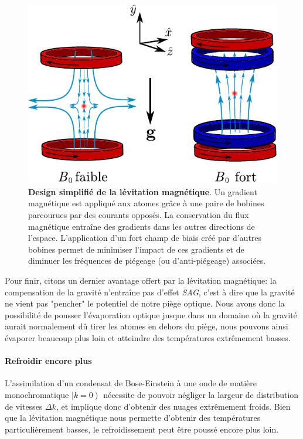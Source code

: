 \begin{figure}
\centering
\includegraphics[scale=1]{Fig/BEC_manip/levitation_simple.pdf}
\caption{\textbf{Design simplifié de la lévitation magnétique}. Un gradient magnétique est appliqué aux atomes grâce à une paire de bobines parcourues par des courants opposés. La conservation du flux magnétique entraîne des gradients dans les autres directions de l'espace. L'application d'un fort champ de biais créé par d'autres bobines permet de minimiser l'impact de ces gradients et de diminuer les fréquences de piégeage (ou d'anti-piégeage) associées.}
\label{fig:levitation_simple}
\end{figure}

Pour finir, citons un dernier avantage offert par la lévitation magnétique: la compensation de la gravité n'entraîne pas d'effet \emph{SAG}, c'est à dire que la gravité ne vient pas "pencher" le potentiel de notre piège optique. Nous avons donc la possibilité de pousser l'évaporation optique jusque dans un domaine où la gravité aurait normalement dû tirer les atomes en dehors du piège, nous pouvons ainsi évaporer beaucoup plus loin et atteindre des températures extrêmement basses.



\paragraph*{Refroidir encore plus}
L'assimilation d'un condensat de Bose-Einstein à une onde de matière monochromatique $\left| k=0 \right\rangle$ nécessite de pouvoir négliger la largeur de distribution de vitesses $\Delta k$, et implique donc d'obtenir des nuages extrêmement froids. Bien que la lévitation magnétique nous permette d'obtenir des températures particulièrement basses, le refroidissement peut être poussé encore plus loin. 

